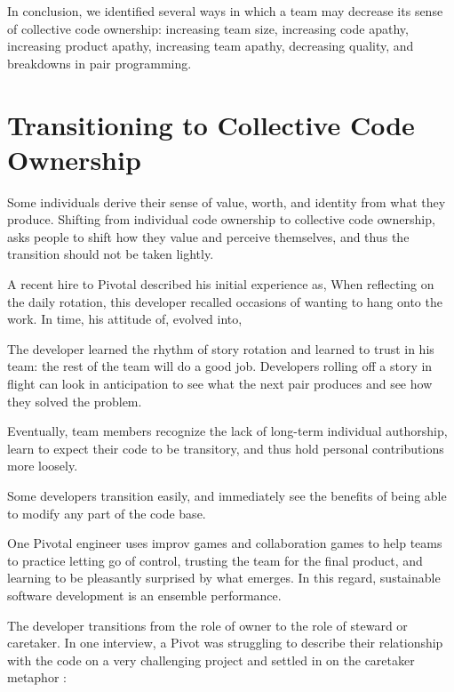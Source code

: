 In conclusion, we identified several ways in which a team may decrease its sense of collective code ownership: increasing team size, increasing code apathy, increasing product apathy, increasing team apathy, decreasing quality, and breakdowns in pair programming.
\section{Transitioning to Collective Code Ownership}
\label{Transitioning}
Some individuals derive their sense of value, worth, and identity from what they produce. Shifting from individual code ownership to collective code ownership, asks people to shift how they value and perceive themselves, and thus the transition should not be taken lightly.

A recent hire to Pivotal described his initial experience as,  When reflecting on the daily rotation, this developer recalled occasions of wanting to hang onto the work.  In time, his attitude of,  evolved into,  

The developer learned the rhythm of story rotation and learned to trust in his team: the rest of the team will do a good job. Developers rolling off a story in flight can look in anticipation to see what the next pair produces and see how they solved the problem. 

Eventually, team members recognize the lack of long-term individual authorship, learn to expect their code to be transitory, and thus hold personal contributions more loosely.   

Some developers transition easily, and immediately see the benefits of being able to modify any part of the code base. 

One Pivotal engineer uses improv games and collaboration games to help teams to practice letting go of control, trusting the team for the final product, and learning to be pleasantly surprised by what emerges. In this regard, sustainable software development is an ensemble performance. 

The developer transitions from the role of owner to the role of steward or caretaker. In one interview, a Pivot was struggling to describe their relationship with the code on a very challenging project and settled in on the caretaker metaphor : 

